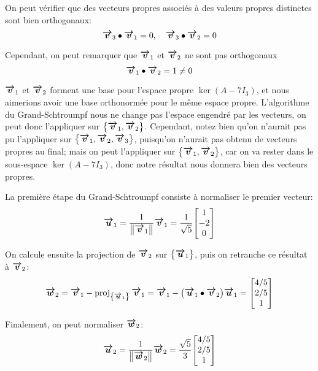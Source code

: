 \documentclass[a4paper]{article}
\begin{document}
{    On peut vérifier que des vecteurs propres associés à des valeurs propres distinctes sont bien orthogonaux: 
    \[\bm{\protect\overrightarrow{v}}_3 \bullet \bm{\protect\overrightarrow{v}}_1 = 0, \quad \bm{\protect\overrightarrow{v}}_3 \bullet \bm{\protect\overrightarrow{v}}_2 = 0\]

    Cependant, on peut remarquer que $\bm{\protect\overrightarrow{v}}_1$ et $\bm{\protect\overrightarrow{v}}_2$ ne sont pas orthogonaux
    \[\bm{\protect\overrightarrow{v}}_1 \bullet \bm{\protect\overrightarrow{v}}_2 = 1 \neq 0\]

    $\bm{\protect\overrightarrow{v}}_1$ et $\bm{\protect\overrightarrow{v}}_2$ forment une base pour l'espace propre $\ker\left(A - 7I_3\right)$, et nous aimerions avoir une base orthonormée pour le même espace propre. L'algorithme du Grand-Schtroumpf nous ne change pas l'espace engendré par les vecteurs, on peut donc l'appliquer sur $\left\{\bvec{v}_1, \bvec{v}_2\right\}$. Cependant, notez bien qu'on n'aurait pas pu l'appliquer sur $\left\{\bvec{v}_1, \bvec{v}_2, \bvec{v}_3\right\}$, puisqu'on n'aurait pas obtenu de vecteurs propres au final; mais on peut l'appliquer sur $\left\{\bvec{v}_1, \bvec{v}_2\right\}$, car on va rester dans le sous-espace $\ker\left(A - 7I_3\right)$, donc notre résultat nous donnera bien des vecteurs propres.

    La première étape du Grand-Schtroumpf consiste à normaliser le premier vecteur: 
    \[\bvec{u}_1 = \frac{1}{\left\|\bvec{v}_1\right\|} \bvec{v}_1 = \frac{1}{\sqrt{5}} \begin{bmatrix} 1 \\ -2 \\ 0 \end{bmatrix} \]
    
    On calcule ensuite la projection de $\bm{\protect\overrightarrow{v}}_2$ sur $\left\{\bvec{u}_1\right\}$, puis on retranche ce résultat à $\bm{\protect\overrightarrow{v}}_2$: 
    \[\bvec{w}_2 = \bvec{v}_1 - \proj_{\left\{\bvec{u}_1\right\}}\bvec{v}_1 = \bvec{v}_1- \left(\bvec{u}_1 \dotprod \bvec{v}_2\right) \bvec{u}_1 = \begin{bmatrix} 4 / 5 \\ 2 / 5 \\ 1 \end{bmatrix} \]
    
    Finalement, on peut normaliser $\bm{\protect\overrightarrow{w}}_2$: 
    \[\bvec{u}_2 = \frac{1}{\left\|\bvec{w}_2\right\|} \bvec{w}_2 = \frac{\sqrt{5}}{3} \begin{bmatrix} 4 / 5 \\ 2 / 5 \\ 1 \end{bmatrix} \]
    
}
\end{document}
